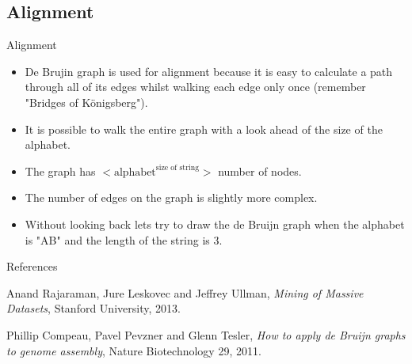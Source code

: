 \documentclass[hyperref={colorlinks=true}]{beamer}
\begin{document}
\subsection{Alignment}
\begin{frame}{Alignment}
  \begin{itemize}
    \item[] De Brujin graph is used for alignment because it is easy to
calculate a path through \alert{all} of its edges whilst walking each edge only
once (remember "Bridges of K{\"o}nigsberg").
    \item[] It is possible to walk the entire graph with a \alert{look ahead}
of the size of the alphabet.
    \item[] The graph has $ <\text{alphabet}^{\text{size of string}}> $ number
of nodes.
    \item[] The number of edges on the graph is slightly more complex.
    \item[] Without looking back lets try to draw the de Bruijn graph when the
alphabet is "AB" and the length of the string is 3.
  \end{itemize}
\end{frame}

\appendix

\begin{frame}{References}
\begin{thebibliography}{2}

  Anand Rajaraman, Jure Leskovec and Jeffrey Ullman,
  \newblock \emph{Mining of Massive Datasets},
  \newblock Stanford University,
  2013.

  Phillip Compeau, Pavel Pevzner and Glenn Tesler,
  \newblock \emph{How to apply de Bruijn graphs to genome assembly},
  \newblock Nature Biotechnology 29,
  2011.

\end{thebibliography}
\end{frame}
\end{document}
